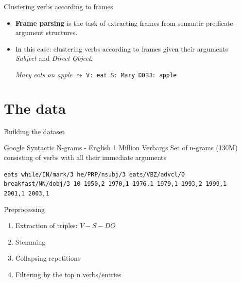 \documentclass[xcolor=svgnames,handout]{beamer}
\begin{document}
\begin{frame}{Clustering verbs according to frames}
  \begin{itemize}
  \item {
    \textbf{Frame parsing} is the task of extracting frames from semantic predicate-argument structures.
    \pause 
  }
  \item {   
    In this case: clustering verbs according to frames given their arguments \textit{Subject} and \textit{Direct Object}.
  \begin{example}
    \textit{Mary eats an apple} $\leadsto$ \texttt{V: eat S: Mary DOBJ: apple}
  \end{example}
  }
  \end{itemize}
\end{frame}

\section{The data}
\begin{frame}{Building the dataset}
\begin{block}{Google Syntactic N-grams - English 1 Million Verbargs}
Set of n-grams (130M) consisting of verbs with all their immediate arguments
\begin{example}
\texttt {\tiny eats	while/IN/mark/3 he/PRP/nsubj/3 eats/VBZ/advcl/0 breakfast/NN/dobj/3	10	1950,2	1970,1	1976,1	1979,1	1993,2	1999,1	2001,1	2003,1}
\end{example}
\pause
\end{block}
\begin{block}{Preprocessing}
\begin{enumerate}
\item Extraction of triples: $V - S - DO$ \pause
\item Stemming \pause
\item Collapsing repetitions \pause
\item Filtering by the top n verbs/entries \pause
\end{enumerate}
\end{block}
\end{frame}
\end{document}

